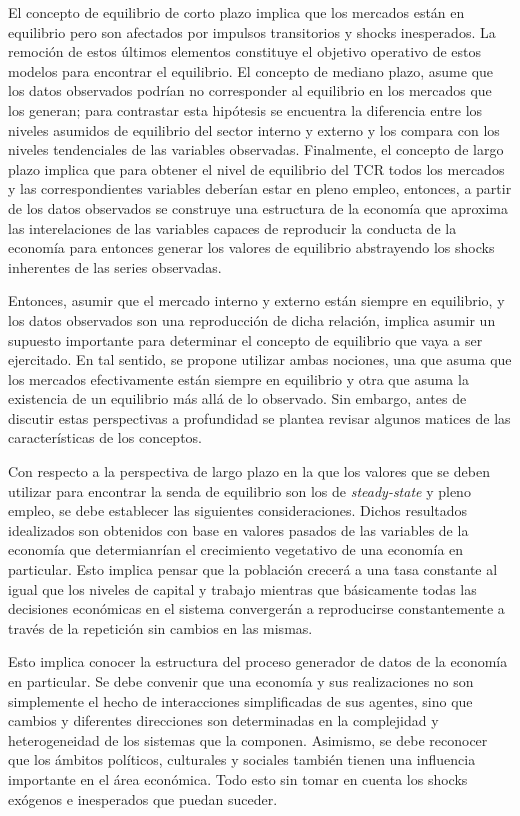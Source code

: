 \documentclass[12pt,letterpaper]{article}
\begin{document}
El concepto de equilibrio de corto plazo implica que los mercados están en equilibrio pero son afectados por impulsos transitorios y shocks inesperados. La remoción de estos últimos elementos constituye el objetivo operativo de estos modelos para encontrar el equilibrio. El concepto de mediano plazo, asume que los datos observados podrían no corresponder al equilibrio en los mercados que los generan; para contrastar esta hipótesis se encuentra la diferencia entre los niveles asumidos de equilibrio del sector interno y externo y los compara con los niveles tendenciales de las variables observadas. Finalmente, el concepto de largo plazo implica que para obtener el nivel de equilibrio del TCR todos los mercados y las correspondientes variables deberían estar en pleno empleo, entonces, a partir de los datos observados se construye una estructura de la economía que aproxima las interelaciones de las variables capaces de reproducir la conducta de la economía para entonces generar los valores de equilibrio abstrayendo los shocks inherentes de las series observadas.

Entonces, asumir que el mercado interno y externo están siempre en equilibrio, y los datos observados son una reproducción de dicha relación, implica asumir un supuesto importante para determinar el concepto de equilibrio que vaya a ser ejercitado. En tal sentido, se propone utilizar ambas nociones, una que asuma que los mercados efectivamente están siempre en equilibrio y otra que asuma la existencia de un equilibrio más allá de lo observado. Sin embargo, antes de discutir estas perspectivas a profundidad se plantea revisar algunos matices de las características de los conceptos.

Con respecto a la perspectiva de largo plazo en la que los valores que se deben utilizar para encontrar la senda de equilibrio son los de \emph{steady-state} y pleno empleo, se debe establecer las siguientes consideraciones. Dichos resultados idealizados son obtenidos con base en valores pasados de las variables de la economía que determianrían el crecimiento vegetativo de una economía en particular. Esto implica pensar que la población crecerá a una tasa constante al igual que los niveles de capital y trabajo mientras que básicamente todas las decisiones económicas en el sistema convergerán a reproducirse constantemente a través de la repetición sin cambios en las mismas. 

Esto implica conocer la estructura del proceso generador de datos de la economía en particular. Se debe convenir que una economía y sus realizaciones no son simplemente el hecho de interacciones simplificadas de sus agentes, sino que cambios y diferentes direcciones son determinadas en la complejidad y heterogeneidad de los sistemas que la componen. Asimismo, se debe reconocer que los ámbitos políticos, culturales y sociales también tienen una influencia importante en el área económica. Todo esto sin tomar en cuenta los shocks exógenos e inesperados que puedan suceder.
\end{document}

